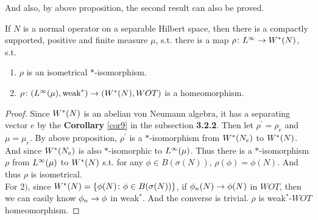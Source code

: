 \documentclass[a4paper,11pt]{report}
\begin{document}
And also, by above proposition, the second result can also be proved.

\begin{thm}
	If $N$ is a normal operator on a separable Hilbert space, then there is a compactly supported, positive and finite measure $\mu$, s.t. there is a map $\rho \colon L^{\infty} \rightarrow W^{*}(N)$, s.t.
	\begin{enumerate}[label=\arabic*)]
		\item $\rho$ is an isometrical $*$-isomorphism.
		\item $\rho \colon (L^{\infty}(\mu), \text{weak}^{*}) \rightarrow (W^{*}(N), WOT)$ is a homeomorphism.
	\end{enumerate}
\end{thm}
\begin{proof}
	Since $W^{*}(N)$ is an abelian von Neumann algebra, it has a separating vector $e$ by the \textbf{Corollary} \ref{cor9} in the subsection \textbf{3.2.2}. Then let $\rho^{'} = \rho_e$ and $\mu = \mu_e$. By above proposition, $\rho^{'}$ is a $*$-isomorphism from $W^{*}(N_e)$ to $W^{*}(N)$. And since $W^{*}(N_e)$ is also $*$-isomorphic to $L^{\infty}(\mu)$. Thus there is a $*$-isomorphism $\rho$ from $L^{\infty}(\mu)$ to $W^{*}(N)$ s.t. for any $\phi \in B(\sigma(N))$, $\rho(\phi) = \phi(N)$. And thus $\rho$ is isometrical.\\
	For $2)$, since $W^{*}(N) = \{\phi(N) \colon \phi \in B(\sigma(N))\}$, if $\phi_n(N) \rightarrow \phi(N)$ in $WOT$, then we can easily know $\phi_n \rightarrow \phi$ in weak$^{*}$. And the converse is trivial. $\rho$ is weak$^{*}$-$WOT$ homeomorphism.
\end{proof}
\end{document}
